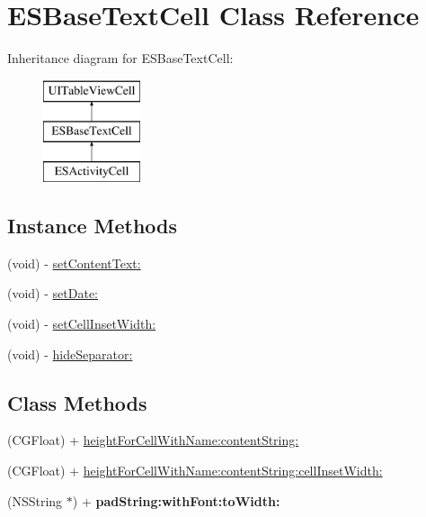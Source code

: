 \hypertarget{interface_e_s_base_text_cell}{}\section{E\+S\+Base\+Text\+Cell Class Reference}
\label{interface_e_s_base_text_cell}
Inheritance diagram for E\+S\+Base\+Text\+Cell\+:\begin{figure}[H]
\begin{center}
\leavevmode
\includegraphics[height=3.000000cm]{interface_e_s_base_text_cell}
\end{center}
\end{figure}
\subsection*{Instance Methods}
\begin{DoxyCompactItemize}
\item 
(void) -\/ \hyperlink{interface_e_s_base_text_cell_a29bc65b944c4f207306908dd5b43b600}{set\+Content\+Text\+:}
\item 
(void) -\/ \hyperlink{interface_e_s_base_text_cell_a16d9d272a52ebaeb2e9b7e74db54f93e}{set\+Date\+:}
\item 
(void) -\/ \hyperlink{interface_e_s_base_text_cell_ab3db27ce3366cf99a8981a876324287f}{set\+Cell\+Inset\+Width\+:}
\item 
(void) -\/ \hyperlink{interface_e_s_base_text_cell_affeb29e2eb30cd2d1b52dd55e1c622df}{hide\+Separator\+:}
\end{DoxyCompactItemize}
\subsection*{Class Methods}
\begin{DoxyCompactItemize}
\item 
(C\+G\+Float) + \hyperlink{interface_e_s_base_text_cell_a5a1525f8fc13f77b319716492d1716df}{height\+For\+Cell\+With\+Name\+:content\+String\+:}
\item 
(C\+G\+Float) + \hyperlink{interface_e_s_base_text_cell_ada32cc7423fb47e2ced411a93cf714c4}{height\+For\+Cell\+With\+Name\+:content\+String\+:cell\+Inset\+Width\+:}
\item 
\hypertarget{interface_e_s_base_text_cell_aaf895972583b362ddaab1eef427febc6}{}(N\+S\+String $\ast$) + {\bfseries pad\+String\+:with\+Font\+:to\+Width\+:}\label{interface_e_s_base_text_cell_aaf895972583b362ddaab1eef427febc6}

\end{DoxyCompactItemize}
